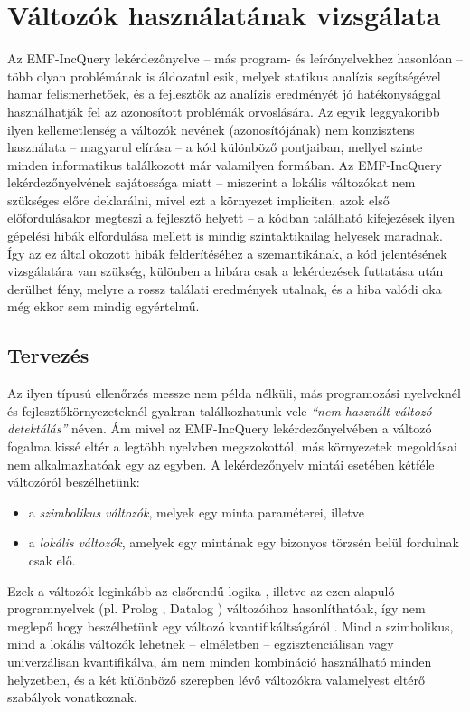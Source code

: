 \chapter{Változók használatának vizsgálata}
%
%

Az EMF-IncQuery lekérdezőnyelve -- más program- és leírónyelvekhez hasonlóan -- több olyan problémának is áldozatul esik, melyek statikus analízis segítségével hamar felismerhetőek, és a fejlesztők az analízis eredményét jó hatékonysággal használhatják fel az azonosított problémák orvoslására.
Az egyik leggyakoribb ilyen kellemetlenség a változók nevének (azonosítójának) nem konzisztens használata -- magyarul elírása -- a kód különböző pontjaiban, mellyel szinte minden informatikus találkozott már valamilyen formában.
Az EMF-IncQuery lekérdezőnyelvének sajátossága miatt -- miszerint a lokális változókat nem szükséges előre deklarálni, mivel ezt a környezet impliciten, azok első előfordulásakor megteszi a fejlesztő helyett -- a kódban található kifejezések ilyen gépelési hibák elfordulása mellett is mindig szintaktikailag helyesek maradnak. Így az ez által okozott hibák felderítéséhez a szemantikának, a kód jelentésének vizsgálatára van szükség, különben a hibára csak a lekérdezések futtatása után derülhet fény, melyre a rossz találati eredmények utalnak, és a hiba valódi oka még ekkor sem mindig egyértelmű.



\section{Tervezés}

Az ilyen típusú ellenőrzés messze nem példa nélküli, más programozási nyelveknél és fejlesztőkörnyezeteknél gyakran találkozhatunk vele \emph{``nem használt változó detektálás''} néven.
Ám mivel az EMF-IncQuery lekérdezőnyelvében a változó fogalma kissé eltér a legtöbb nyelvben megszokottól, más környezetek megoldásai nem alkalmazhatóak egy az egyben.
A lekérdezőnyelv mintái esetében kétféle változóról beszélhetünk:
\begin{itemize}

  \item a \emph{szimbolikus változók}, melyek egy minta paraméterei, illetve
  \item a \emph{lokális változók}, amelyek egy mintának egy bizonyos törzsén belül fordulnak csak elő.
\end{itemize}
Ezek a változók leginkább az elsőrendű logika \cite{wiki:FirstOrderLogic}, illetve az ezen alapuló programnyelvek (pl. Prolog \cite{wiki:Prolog}, Datalog \cite{wiki:Datalog}) változóihoz hasonlíthatóak, így nem meglepő hogy beszélhetünk egy változó kvantifikáltságáról \cite{wiki:Quantification}.
Mind a szimbolikus, mind a lokális változók lehetnek -- elméletben -- egzisztenciálisan vagy univerzálisan kvantifikálva, ám nem minden kombináció használható minden helyzetben, és a két különböző szerepben lévő változókra valamelyest eltérő szabályok vonatkoznak.


